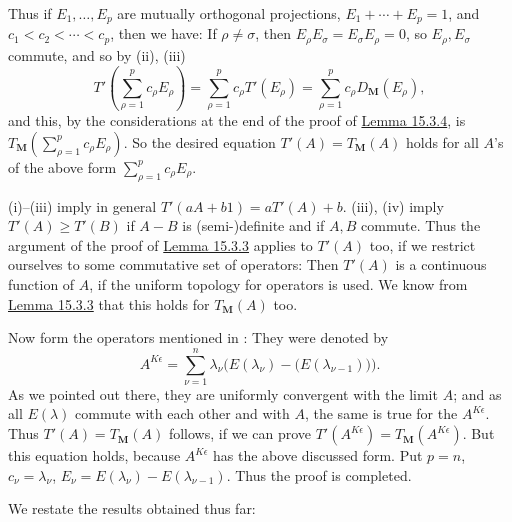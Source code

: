 \documentclass[12pt,b5paper,twoside]{article}
\newcommand{\M}{\mathbf M}
\newcommand{\lemref}[1]{\hyperref[lem:#1]{Lemma #1}}
\begin{document}
Thus if \(E_1,\ldots,E_p\) are mutually orthogonal projections,
\(E_1+\cdots+E_p=1\), and \(c_1<c_2<\cdots<c_p\), then we have: If
\(\rho\ne\sigma\), then \(E_\rho E_\sigma=E_\sigma E_\rho=0\), so
\(E_\rho,E_\sigma\) commute, and so by (ii), (iii)
\[
T'\left(\sum_{\rho=1}^pc_\rho E_\rho\right)
=\sum_{\rho=1}^pc_\rho T'(E_\rho)
=\sum_{\rho=1}^pc_\rho D_{\M}(E_\rho),
\]
and this, by the considerations at the end of the proof of \lemref{15.3.4},
is \(T_{\M}(\sum_{\rho=1}^pc_\rho E_\rho)\). So the desired equation
\(T'(A)=T_{\M}(A)\) holds for all \(A\)'s of the above form
\(\sum_{\rho=1}^pc_\rho E_\rho\).

(i)--(iii) imply in general \(T'(aA+b1)=aT'(A)+b\). (iii), (iv) imply
\(T'(A)\geq T'(B)\) if \(A-B\) is (semi-)definite and if \(A,B\) commute.
Thus the argument of the proof of \lemref{15.3.3} applies to \(T'(A)\) too,
if we restrict ourselves to some commutative set of operators: Then
\(T'(A)\) is a continuous function of \(A\), if the uniform topology for
operators is used. We know from \lemref{15.3.3} that this holds for
\(T_{\M}(A)\) too.

Now form the operators mentioned in
\cite[pp.~390--391, in particular footnote~43]{ref18}: They were denoted by
\[
A^{K\epsilon}=\sum_{\nu=1}^n\lambda_\nu
   \bigl(E(\lambda_\nu)-\bigl(E(\lambda_{\nu-1})\bigr)\bigr).
\]
As we pointed out there, they are uniformly convergent with the limit \(A\);
and as all \(E(\lambda)\) commute with each other and with \(A\), the same is
true for the \(A^{K\epsilon}\). Thus \(T'(A)=T_{\M}(A)\) follows, if we can
prove \(T'(A^{K\epsilon})=T_{\M}(A^{K\epsilon})\). But this equation holds,
because \(A^{K\epsilon}\) has the above discussed form. Put \(p=n\),
\(c_\nu=\lambda_\nu\),
\(E_\nu=E(\lambda_\nu)-E(\lambda_{\nu-1})\). Thus the proof is completed.

We restate the results obtained thus far:
\end{document}
